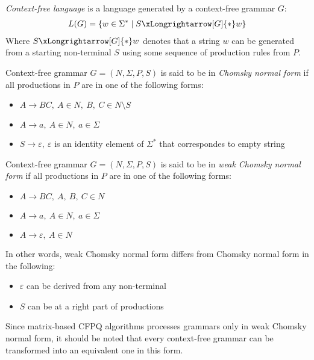 \begin{definition} \emph{Context-free language} is a language generated by a context-free grammar $G$:
\begin{align*}
     L(G) = \{w \in \Sigma^* \mid S \xLongrightarrow[G]{*} w \} 
\end{align*}
Where $S \xLongrightarrow[G]{*} w$  denotes that a string $w$ can be generated from a starting non-terminal $S$ using some sequence of production rules from $P$.
\end{definition}

\begin{definition} Context-free grammar $G = (N, \Sigma, P, S)$ is said to be in \emph{Chomsky normal form} if all productions in $P$ are in one of the following forms:
    \begin{itemize}
        \item $A \rightarrow BC,~A \in N,~B,~C \in N \setminus S$
        \item  $A \rightarrow a,~A \in N,~a \in \Sigma$
        \item $S \rightarrow \varepsilon,~\varepsilon$ is an identity element of $\Sigma^*$ that correspondes to empty string
    \end{itemize}
\end{definition}
\begin{definition} Context-free grammar $G = (N, \Sigma, P, S)$ is said to be in \emph{weak Chomsky normal form} if all productions in $P$ are in one of the following forms:
    \begin{itemize}
        \item $A \rightarrow BC,~A,~B,~C \in N$
        \item  $A \rightarrow a,~A \in N,~a \in \Sigma$
        \item $A \rightarrow \varepsilon,~A \in N$
    \end{itemize}
\end{definition}
In other words, weak Chomsky normal form differs from Chomsky normal form in the following:
\begin{itemize}
    \item $\varepsilon$ can be derived from any non-terminal
    \item $S$ can be at a right part of productions
\end{itemize}
Since matrix-based CFPQ algorithms processes grammars only in weak Chomsky normal form, it should be noted that every context-free grammar can be transformed into an equivalent one in this form. 


